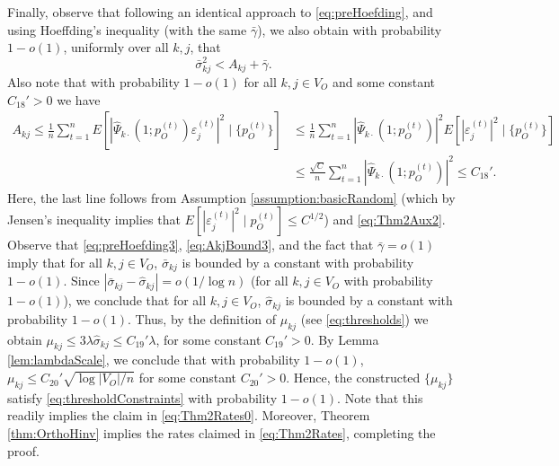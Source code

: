 \documentclass[opre,nonblindrev]{informs3} %
\begin{document}
\begin{APPENDIX}{}
  Finally, observe that following an identical approach to \eqref{eq:preHoefding}, and using Hoeffding's inequality (with the same $\bar{\gamma}$), we also obtain
  with probability $1-o(1)$, uniformly over all $k,j$, that
  \begin{equation}\label{eq:preHoefding3}
 \bar\sigma_{kj}^2 < A_{kj} + \bar{\gamma} .
  \end{equation}
  Also note that with probability $1-o(1)$ for all $k,j\in V_O$
  and some constant $C_{18}'>0$
   we have
   \begin{equation} \label{eq:AkjBound3}
   \begin{aligned}
   A_{kj} \leq  \frac{1}{n}\sum_{t=1}^n E[|\hat\Psi_{k\cdot}(1;p_O^{(t)}) \varepsilon_j^{(t)}|^2 \mid  \{p_O^{(t)} \} ]
   &\leq 
   \frac{1}{n}\sum_{t=1}^n 
   |\hat\Psi_{k\cdot}(1;p_O^{(t)})|^2 
   E[|\varepsilon_j^{(t)}|^2 \mid  \{p_O^{(t)} \} ] \\
   &\leq 
   \frac{\sqrt{C}}{n}\sum_{t=1}^n 
   |\hat\Psi_{k\cdot}(1;p_O^{(t)})|^2 
   \leq C_{18}'.
   \end{aligned}
   \end{equation}
   Here, the last line follows from Assumption \ref{assumption:basicRandom}
   (which by Jensen's inequality implies that
   $E[|\varepsilon_j^{(t)}|^2 \mid  p_O^{(t)}  ] \leq C^{1/2}$) 
   and \eqref{eq:Thm2Aux2}.
Observe that
\eqref{eq:preHoefding3}, \eqref{eq:AkjBound3},  and the fact that $\bar{\gamma}=o(1)$
imply  
that 
for all $k,j\in V_O$,
$\bar\sigma_{kj}$ is bounded by a constant with probability $1-o(1)$.
Since 
$
|\bar\sigma_{kj}-\hat\sigma_{kj}|  = o(1/\log n)$
(for all $k,j\in V_O$ with probability $1-o(1)$), we conclude 
that 
for all $k,j\in V_O$,
$\hat\sigma_{kj}$ is bounded by a constant with probability $1-o(1)$.
Thus, by the definition of $\mu_{kj}$ (see \eqref{eq:thresholds}) we obtain
  $\mu_{kj} \leq 3 \lambda \hat{\sigma}_{kj} \leq C_{19}'  \lambda$,
  for some constant $C_{19}'>0$.
  By Lemma \ref{lem:lambdaScale}, we conclude that
  with probability $1-o(1)$,   $\mu_{kj}\leq C_{20}' \sqrt{\log|V_O|/n}$ for some constant $C_{20}'>0$. Hence, the constructed $\{\mu_{kj}\}$ satisfy
  \eqref{eq:thresholdConstraints} with probability $1-o(1)$.
  Note that this readily implies the claim in \eqref{eq:Thm2Rates0}.
Moreover, Theorem \ref{thm:OrthoHinv} implies the rates claimed in \eqref{eq:Thm2Rates}, completing the proof.~\hfill \halmos	
\endproof
 







\end{APPENDIX}
\end{document}
